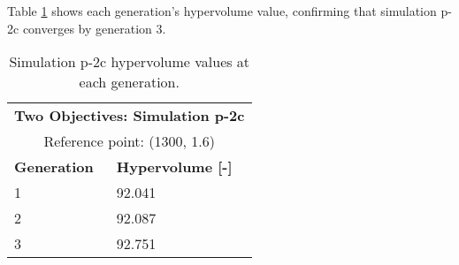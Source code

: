Table \ref{tab:p2c-hypervolume} shows each generation's hypervolume value, 
confirming that simulation p-2c converges by generation 3. 
\begin{table}[htbp!]
    \centering
    \onehalfspacing
    \caption{Simulation p-2c hypervolume values at each generation.}
	\label{tab:p2c-hypervolume}
    \footnotesize
    \begin{tabular}{ll}
    \hline 
    \multicolumn{2}{c}{\textbf{Two Objectives: Simulation p-2c}} \\
    \multicolumn{2}{c}{Reference point: (1300, 1.6)} \\
    \hline 
    \textbf{Generation} & \textbf{Hypervolume [-]} \\
    \hline
    1 & 92.041 \\
    2 & 92.087\\
    3 & 92.751 \\
    \hline
    \end{tabular}
\end{table}

